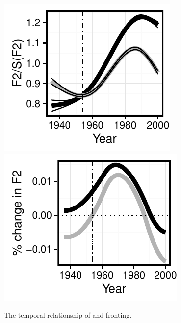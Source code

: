 \documentclass[12pt]{article}
\begin{document}
\vspace*{6pt}
\begin{figure}[H]
\centering
\includegraphics{owuwparallel.pdf}
\includegraphics{owuwparallelROC.pdf}
\caption{The temporal relationship of  and  fronting.}
\end{figure}
\vspace*{6pt}
\end{document}
